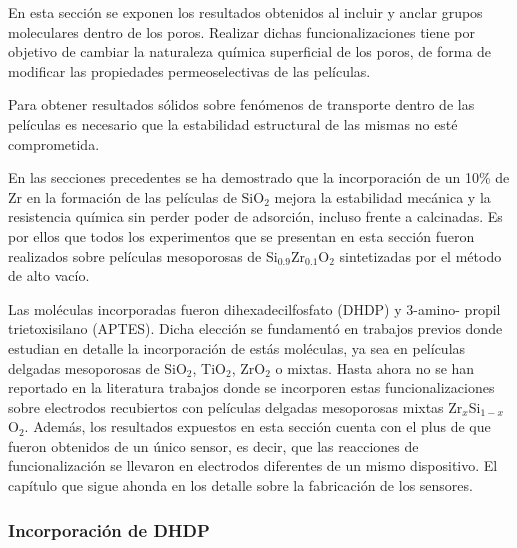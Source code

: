 			En esta sección se exponen los resultados obtenidos al incluir y anclar grupos moleculares dentro de los poros. Realizar dichas funcionalizaciones tiene por objetivo de cambiar la naturaleza química superficial de los poros, de forma de modificar las propiedades permeoselectivas de las películas. 

			Para obtener resultados sólidos sobre fenómenos de transporte dentro de las películas es necesario que la estabilidad estructural de las mismas no esté comprometida. 

			En las secciones precedentes se ha demostrado que la incorporación de un 10\% de Zr en la formación de las películas de SiO$_2$ mejora la estabilidad mecánica y la resistencia química sin perder poder de adsorción, incluso frente a \pdmF\space calcinadas. Es por ellos que todos los experimentos que se presentan en esta sección fueron realizados sobre películas mesoporosas de  Si$_{0.9}$Zr$_{0.1}$O$_2$ sintetizadas por el método de alto vacío.

			Las moléculas incorporadas fueron dihexadecilfosfato (DHDP) y 3-amino-\- propil trietoxisilano (APTES). Dicha elección se fundamentó en trabajos previos donde estudian en detalle la incorporación de estás moléculas, ya sea en películas delgadas mesoporosas de SiO$_2$, TiO$_2$, ZrO$_2$ o mixtas.\cite{Calvo2009b,Angelome2008,Fattakhova-Rohlfing2007,Andrieu-brunsen2014,Andrieu-Brunsen2015} Hasta ahora no se han reportado en la literatura trabajos donde se incorporen estas funcionalizaciones sobre electrodos recubiertos con películas delgadas mesoporosas mixtas Zr$_x$Si$_{1-x}$O$_2$. Además, los resultados expuestos en esta sección cuenta con el plus de que fueron obtenidos de un único sensor, es decir, que las reacciones de funcionalización se llevaron en electrodos diferentes de un mismo dispositivo. El capítulo que sigue ahonda en los detalle sobre la fabricación de los sensores.
	
		\subsubsection{Incorporación de DHDP}
	
